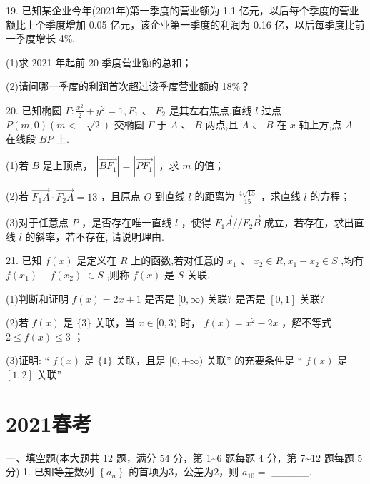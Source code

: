 \documentclass[10pt]{article}
\begin{document}
19. 已知某企业今年(2021年)第一季度的营业额为 1.1 亿元，以后每个季度的营业额比上个季度增加 0.05 亿元，该企业第一季度的利润为 0.16 亿，以后每季度比前一季度增长 4\%.

(1)求 2021 年起前 20 季度营业额的总和；

(2)请问哪一季度的利润首次超过该季度营业额的 18\%？

20. 已知椭圆 \(\Gamma  : \frac{{x}^{2}}{2} + {y}^{2} = 1,{F}_{1}\text{ 、 }{F}_{2}\) 是其左右焦点,直线 \(l\) 过点 \(P\left( {m,0}\right) \left( {m <  - \sqrt{2}}\right)\) 交椭圆 \(\Gamma\) 于 \(A\text{ 、 }B\) 两点,且 \(A\text{ 、 }B\) 在 \(x\) 轴上方,点 \(A\) 在线段 \({BP}\) 上.

(1)若 \(B\) 是上顶点， \(\left| \overrightarrow{B{F}_{1}}\right|  = \left| \overrightarrow{P{F}_{1}}\right|\) ，求 \(m\) 的值；

(2)若 \(\overrightarrow{{F}_{1}A} \cdot  \overrightarrow{{F}_{2}A} = {13}\) ，且原点 \(O\) 到直线 \(l\) 的距离为 \(\frac{4\sqrt{15}}{15}\) ，求直线 \(l\) 的方程；

(3)对于任意点 \(P\) ，是否存在唯一直线 \(l\) ，使得 \(\overrightarrow{{F}_{1}A}//\overrightarrow{{F}_{2}B}\) 成立，若存在，求出直线 \(l\) 的斜率，若不存在, 请说明理由.

21. 已知 \(f\left( x\right)\) 是定义在 \(R\) 上的函数,若对任意的 \({x}_{1}\text{ 、 }{x}_{2} \in  R,{x}_{1} - {x}_{2} \in  S\) ,均有 \(f\left( {x}_{1}\right)  - f\left( {x}_{2}\right) \; \in  S\) ,则称 \(f\left( x\right)\) 是 \(S\) 关联.

(1)判断和证明 \(f\left( x\right)  = {2x} + 1\) 是否是 \(\lbrack 0,\infty )\) 关联? 是否是 \(\left\lbrack  {0,1}\right\rbrack\) 关联?

(2)若 \(f\left( x\right)\) 是 \(\{ 3\}\) 关联，当 \(x \in  \lbrack 0,3)\) 时， \(f\left( x\right)  = {x}^{2} - {2x}\) ，解不等式 \(2 \leq  f\left( x\right)  \leq  3\) ；

(3)证明: “ \(f\left( x\right)\) 是 \(\{ 1\}\) 关联，且是 \(\lbrack 0, + \infty )\) 关联” 的充要条件是 “ \(f\left( x\right)\) 是 \(\left\lbrack  {1,2}\right\rbrack\) 关联” .

\section*{2021春考}

一、填空题(本大题共 12 题，满分 54 分，第 1\textasciitilde 6 题每题 4 分，第 7\textasciitilde 12 题每题 5 分) 1. 已知等差数列 \(\left\{  {a}_{n}\right\}\) 的首项为3，公差为2，则 \({a}_{10} =\) \_\_\_\_\_.
\end{document}
